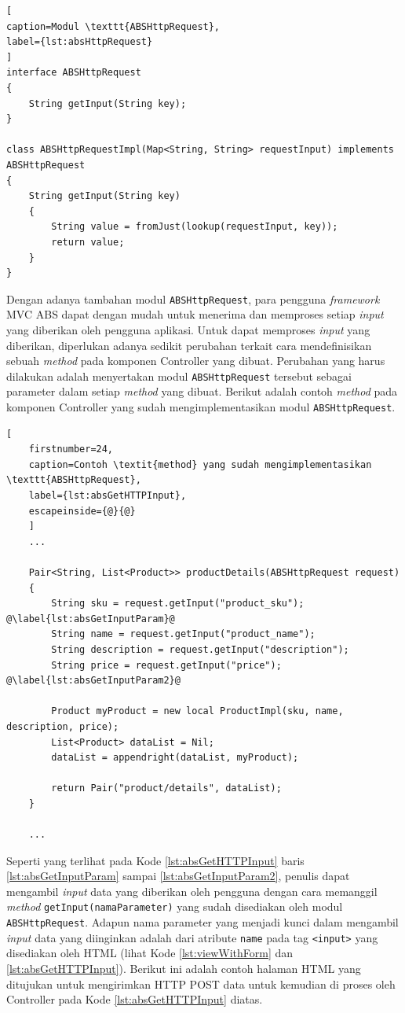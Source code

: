 \begin{lstlisting}[
caption=Modul \texttt{ABSHttpRequest},
label={lst:absHttpRequest}
]
interface ABSHttpRequest
{
	String getInput(String key);
}

class ABSHttpRequestImpl(Map<String, String> requestInput) implements ABSHttpRequest
{
	String getInput(String key)
	{
		String value = fromJust(lookup(requestInput, key));
		return value;
	}
}
\end{lstlisting}

Dengan adanya tambahan modul \texttt{ABSHttpRequest}, para pengguna \textit{framework} MVC ABS dapat dengan mudah untuk menerima dan memproses setiap \textit{input} yang diberikan oleh pengguna aplikasi. Untuk dapat memproses \textit{input} yang diberikan, diperlukan adanya sedikit perubahan terkait cara mendefinisikan sebuah \textit{method} pada komponen Controller yang dibuat. Perubahan yang harus dilakukan adalah menyertakan modul \texttt{ABSHttpRequest} tersebut sebagai parameter dalam setiap \textit{method} yang dibuat. Berikut adalah contoh \textit{method} pada komponen Controller yang sudah mengimplementasikan modul \texttt{ABSHttpRequest}.

\begin{minipage}{\linewidth}
    \begin{lstlisting}[
    firstnumber=24,
    caption=Contoh \textit{method} yang sudah mengimplementasikan \texttt{ABSHttpRequest},
    label={lst:absGetHTTPInput},
    escapeinside={@}{@}
    ]
    ...
    
    Pair<String, List<Product>> productDetails(ABSHttpRequest request)
    {
    	String sku = request.getInput("product_sku"); @\label{lst:absGetInputParam}@
    	String name = request.getInput("product_name");
    	String description = request.getInput("description");
    	String price = request.getInput("price"); @\label{lst:absGetInputParam2}@
    	
    	Product myProduct = new local ProductImpl(sku, name, description, price);
    	List<Product> dataList = Nil;
    	dataList = appendright(dataList, myProduct);
    	
    	return Pair("product/details", dataList);
    }
    
    ...
    \end{lstlisting}
\end{minipage}

Seperti yang terlihat pada Kode \ref{lst:absGetHTTPInput} baris \ref{lst:absGetInputParam} sampai \ref{lst:absGetInputParam2}, penulis dapat mengambil \textit{input} data yang diberikan oleh pengguna dengan cara memanggil \textit{method} \texttt{getInput(namaParameter)} yang sudah disediakan oleh modul \texttt{ABSHttpRequest}. Adapun nama parameter yang menjadi kunci dalam mengambil \textit{input} data yang diinginkan adalah dari atribute \texttt{name} pada tag \texttt{<input>} yang disediakan oleh HTML (lihat Kode \ref{lst:viewWithForm} dan \ref{lst:absGetHTTPInput}). Berikut ini adalah contoh halaman HTML yang ditujukan untuk mengirimkan HTTP POST data untuk kemudian di proses oleh Controller pada Kode \ref{lst:absGetHTTPInput} diatas.

